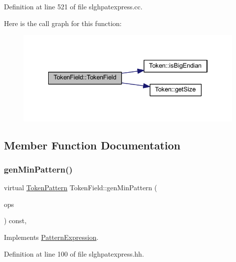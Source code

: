 Definition at line 521 of file slghpatexpress.\+cc.

Here is the call graph for this function\+:
\nopagebreak
\begin{figure}[H]
\begin{center}
\leavevmode
\includegraphics[width=334pt]{class_token_field_a1bfdc53c1f698232c5af0e89cc14107c_cgraph}
\end{center}
\end{figure}


\subsection{Member Function Documentation}
\mbox{\label{class_token_field_a9ad83c4d71dbd0f22c12f670cb07c11c}} 
\subsubsection{\texorpdfstring{genMinPattern()}{genMinPattern()}}
{\footnotesize\ttfamily virtual \mbox{\hyperlink{class_token_pattern}{Token\+Pattern}} Token\+Field\+::gen\+Min\+Pattern (\begin{DoxyParamCaption}\item[{const vector$<$ \mbox{\hyperlink{class_token_pattern}{Token\+Pattern}} $>$ \&}]{ops }\end{DoxyParamCaption}) const\hspace{0.3cm}{\ttfamily [inline]}, {\ttfamily [virtual]}}



Implements \mbox{\hyperlink{class_pattern_expression_a1dc2d0c07f64fdab9da6c0849e992b50}{Pattern\+Expression}}.



Definition at line 100 of file slghpatexpress.\+hh.

\mbox{\label{class_token_field_a4ce6c18cfc9973c24d7da7314ce8092e}} 
